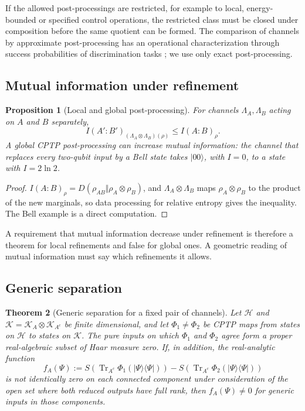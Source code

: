 \documentclass[12pt,a4paper]{article}
\newtheorem{theorem}{Theorem}[section]
\newtheorem{proposition}[theorem]{Proposition}
\begin{document}
If the allowed post-processings are restricted, for example to local, energy-bounded or specified control operations, the restricted class must be closed under composition before the same quotient can be formed. The comparison of channels by approximate post-processing has an operational characterization through success probabilities of discrimination tasks \cite{Jencova2015}; we use only exact post-processing.

\subsection{Mutual information under refinement}

\begin{proposition}[Local and global post-processing]
\label{prop:mi}
For channels $\Lambda_A,\Lambda_B$ acting on $A$ and $B$ separately,
\[
I(A':B')_{(\Lambda_A\otimes\Lambda_B)(\rho)}\le I(A:B)_\rho .
\]
A global CPTP post-processing can increase mutual information: the channel that replaces every two-qubit input by a Bell state takes $|00\rangle$, with $I=0$, to a state with $I=2\ln2$.
\end{proposition}

\begin{proof}
$I(A:B)_\rho=D(\rho_{AB}\Vert\rho_A\otimes\rho_B)$, and $\Lambda_A\otimes\Lambda_B$ maps $\rho_A\otimes\rho_B$ to the product of the new marginals, so data processing for relative entropy gives the inequality. The Bell example is a direct computation.
\end{proof}

A requirement that mutual information decrease under refinement is therefore a theorem for local refinements and false for global ones. A geometric reading of mutual information must say which refinements it allows.

\subsection{Generic separation}

\begin{theorem}[Generic separation for a fixed pair of channels]
\label{thm:inequiv}
Let $\mathcal H$ and $\mathcal K=\mathcal K_A\otimes\mathcal K_{A^c}$ be finite dimensional, and let $\Phi_1\ne\Phi_2$ be CPTP maps from states on $\mathcal H$ to states on $\mathcal K$. The pure inputs on which $\Phi_1$ and $\Phi_2$ agree form a proper real-algebraic subset of Haar measure zero. If, in addition, the real-analytic function
\[
f_A(\Psi):=
S\!\left(\operatorname{Tr}_{A^c}\Phi_1(|\Psi\rangle\!\langle\Psi|)\right)
-S\!\left(\operatorname{Tr}_{A^c}\Phi_2(|\Psi\rangle\!\langle\Psi|)\right)
\]
is not identically zero on each connected component under consideration of the open set where both reduced outputs have full rank, then $f_A(\Psi)\ne0$ for generic inputs in those components.
\end{theorem}
\end{document}
